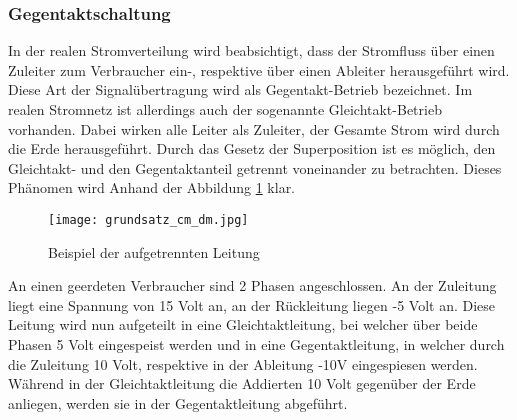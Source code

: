 \subsubsection{Gegentaktschaltung} \label{subsec:gegentakt}

In der realen Stromverteilung wird beabsichtigt, dass der Stromfluss über einen Zuleiter zum Verbraucher ein-, respektive über einen Ableiter herausgeführt wird. 
Diese Art der Signalübertragung wird als Gegentakt-Betrieb bezeichnet. Im realen Stromnetz ist allerdings auch der sogenannte Gleichtakt-Betrieb vorhanden. Dabei wirken alle Leiter als Zuleiter, der Gesamte Strom wird durch die Erde herausgeführt. Durch das Gesetz der Superposition ist es möglich, den Gleichtakt- und den Gegentaktanteil getrennt voneinander zu betrachten. Dieses Phänomen wird Anhand der Abbildung \ref{fig:auftrennen_der_leitung} klar. 

\begin{figure}[H]
	\centering
	\texttt{[image: grundsatz\_cm\_dm.jpg]}
	\caption{Beispiel der aufgetrennten Leitung}
	\label{fig:auftrennen_der_leitung}
\end{figure} 

An einen geerdeten Verbraucher sind 2 Phasen angeschlossen. An der Zuleitung liegt eine Spannung von 15 Volt an, an der Rückleitung liegen -5 Volt an. Diese Leitung wird nun aufgeteilt in eine Gleichtaktleitung, bei welcher über beide Phasen 5 Volt eingespeist werden und in eine Gegentaktleitung, in welcher durch die Zuleitung 10 Volt, respektive in der Ableitung -10V eingespiesen werden. Während in der Gleichtaktleitung die Addierten 10 Volt gegenüber der Erde anliegen, werden sie in der Gegentaktleitung abgeführt.
 
 
